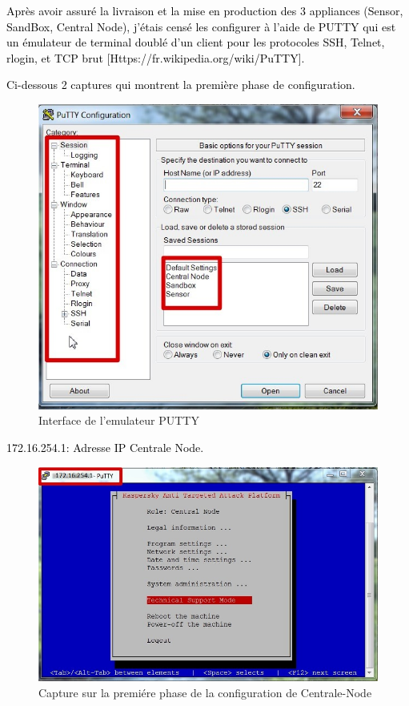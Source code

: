 \textcolor{black}{Après avoir assuré la livraison et la mise en production des 3 appliances (Sensor, SandBox, Central Node), j’étais censé les configurer à l’aide de PUTTY qui est un émulateur de terminal doublé d'un client pour les protocoles SSH, Telnet, rlogin, et TCP brut [Https://fr.wikipedia.org/wiki/PuTTY].}

\textcolor{black}{Ci-dessous 2 captures qui montrent la première phase de configuration.}

\begin{figure}[H]
	\begin{center}
		\includegraphics[width=0.8\linewidth]{Projet_KATA/iPutty}
\end{center}
	\caption{Interface de l'emulateur PUTTY}
	\label{fig:7}	
\end{figure}
\textcolor{black}{172.16.254.1: Adresse IP Centrale Node.}
\begin{figure}[H]
	\begin{center}
		\includegraphics[width=0.8\linewidth]{Projet_KATA/Putty}
\end{center}
	\caption{Capture sur la premiére phase de la configuration de Centrale-Node}
	\label{fig:8}	
\end{figure}		 
		 
